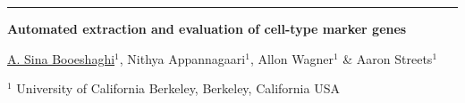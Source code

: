 \documentclass[final]{article}
\newcommand{\TitleFont}{\fontsize{76}{84}\selectfont}
\newcommand{\AuthorFont}{\fontsize{34}{40}\selectfont}
\newcommand{\AffilFont}{\fontsize{24}{30}\selectfont}
\begin{document}
\pagecolor{white}
\color{textgray}

{\color{berkeleyblue}\rule{\linewidth}{8pt}}
\vspace{0.18in}

{\TitleFont\bfseries Automated extraction and evaluation of cell-type marker genes\par}
\vspace{0.18in}
{\AuthorFont \underline{A. Sina Booeshaghi}$^{1}$, Nithya Appannagaari$^{1}$, Allon Wagner$^{1}$ \& Aaron Streets$^{1}$\par}
\vspace{0.08in}
{\AffilFont $^{1}$ University of California Berkeley, Berkeley, California USA\par}

\vspace{0.25in}
\end{document}
